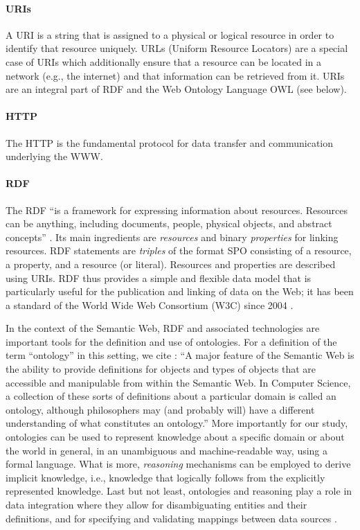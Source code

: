 \paragraph{URIs}
A \gls{URI} is a string that is assigned to a physical or logical resource
in order to identify that resource uniquely. URLs (Uniform Resource Locators)
are a special case of URIs which additionally ensure that a resource
can be located in a network (e.g., the internet) and that information can be retrieved from it.
URIs are an integral part of RDF and the Web Ontology Language OWL (see below).

\paragraph{HTTP}
The \gls{HTTP} is the fundamental protocol for data transfer and communication underlying the \gls{WWW}.

\paragraph{RDF}
The \gls{RDF} \enquote{is a framework for expressing information about resources. Resources can be anything, including documents, people, physical objects, and abstract concepts}
\autocite{RDFPrimer}.
Its main ingredients are \emph{resources} and binary \emph{properties} for linking resources.
RDF statements are \emph{triples} of the format \gls{SPO}
consisting of a resource, a property, and a resource (or literal).
Resources and properties are described using \glspl{URI}.
RDF thus provides a simple and flexible data model that is particularly useful for the publication
and linking of data on the Web;
it has been a standard of the
World Wide Web Consortium (W3C) since 2004 \autocite{W3CRDF}.

\par\medskip
In the context of the Semantic Web, \gls{RDF} and associated technologies
are important tools for the definition and use of ontologies.
For a definition of the term \enquote{ontology} in this setting, we cite \textcite{Horrocks2011}:
\enquote{A major feature of the Semantic Web is the ability to provide definitions for objects and types of objects that are accessible and manipulable from within the Semantic Web. In Computer Science, a collection of these sorts of definitions about a particular domain is called an ontology, although philosophers may (and probably will) have a different understanding of what constitutes an ontology.}
More importantly for our study, ontologies can be used to represent knowledge about a specific domain
or about the world in general, in an unambiguous and machine-readable way, using a formal language.
What is more, \emph{reasoning} mechanisms can be employed to derive implicit knowledge,
i.e., knowledge that logically follows from the explicitly represented knowledge.
Last but not least, ontologies and reasoning play a role in data integration
where they allow for disambiguating entities and their definitions,
and for specifying and validating mappings between data sources
\autocites[cf.][]{Wache2001}[§12]{Doan2012}.

